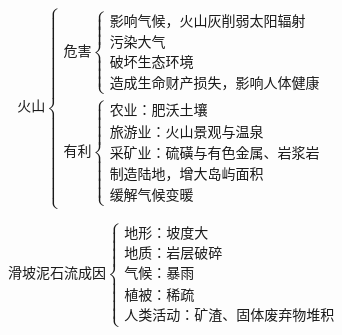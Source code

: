 \documentclass[UTF8]{ctexart}
\begin{document}
\begin{multicols}{2}

    \[
        \textbf{火山}
        \begin{cases}
            \text{危害}
            \begin{cases}
                \text{影响气候，火山灰削弱太阳辐射}\\
                \text{污染大气}\\
                \text{破坏生态环境}\\
                \text{造成生命财产损失，影响人体健康}
            \end{cases}\\
            \text{有利}
            \begin{cases}
                \text{农业：肥沃土壤}\\
                \text{旅游业：火山景观与温泉}\\
                \text{采矿业：硫磺与有色金属、岩浆岩}\\
                \text{制造陆地，增大岛屿面积}\\
                \text{缓解气候变暖}
            \end{cases}
        \end{cases}
    \]

    \[
        \textbf{滑坡泥石流成因}
        \begin{cases}
            \text{地形：坡度大}\\
            \text{地质：岩层破碎}\\
            \text{气候：暴雨}\\
            \text{植被：稀疏}\\
            \text{人类活动：矿渣、固体废弃物堆积}
        \end{cases}
    \]

\end{multicols}
\end{document}
